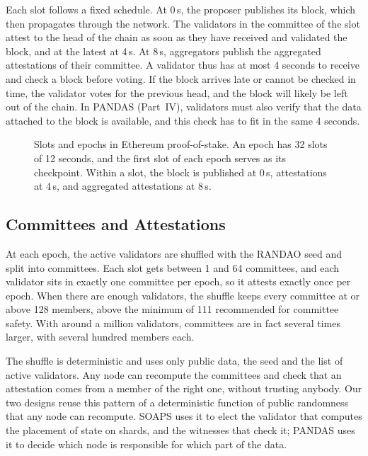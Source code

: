 Each slot follows a fixed schedule.
At 0\,s, the proposer publishes its block, which then propagates through the network.
The validators in the committee of the slot attest to the head of the chain as soon as they have received and validated the block, and at the latest at 4\,s.
At 8\,s, aggregators publish the aggregated attestations of their committee.
A validator thus has at most 4 seconds to receive and check a block before voting. 
If the block arrives late or cannot be checked in time, the validator votes for the previous head, and the block will likely be left out of the chain.
In PANDAS (Part~IV), validators must also verify that the data attached to the block is available, and this check has to fit in the same 4 seconds.

\begin{figure}[t]
	\centering
	
	\caption{Slots and epochs in Ethereum proof-of-stake.
		An epoch has 32 slots of 12 seconds, and the first slot of each epoch serves as its checkpoint.
		Within a slot, the block is published at 0\,s, attestations at 4\,s, and aggregated attestations at 8\,s.}
	\label{fig:bg:eth-slot}
\end{figure}

\subsection{Committees and Attestations}\label{sec:bg:eth-pos:committees}

At each epoch, the active validators are shuffled with the RANDAO seed and split into committees.
Each slot gets between 1 and 64 committees, and each validator sits in exactly one committee per epoch, so it attests exactly once per epoch.
When there are enough validators, the shuffle keeps every committee at or above 128 members, above the minimum of 111 recommended for committee safety.
With around a million validators, committees are in fact several times larger, with several hundred members each.

The shuffle is deterministic and uses only public data, the seed and the list of active validators.
Any node can recompute the committees and check that an attestation comes from a member of the right one, without trusting anybody.
Our two designs reuse this pattern of a deterministic function of public randomness that any node can recompute.
SOAPS uses it to elect the validator that computes the placement of state on shards, and the witnesses that check it; PANDAS uses it to decide which node is responsible for which part of the data.

